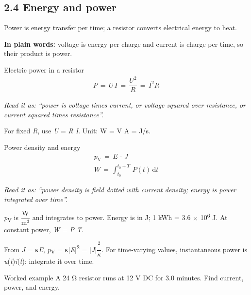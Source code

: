 \documentclass[11pt]{article}
\begin{document}
\begin{keepsection}
\section{2.4 Energy and power}

Power is energy transfer per time; a resistor converts electrical energy to heat.

\begin{plainbox}\textbf{In plain words:} voltage is energy per charge and current is charge per time, so their product is power.\end{plainbox}

\begin{equationcard}{Electric power in a resistor}
\[ \begin{gathered} {P}\, =\, {U\,I}\, =\, \dfrac{{U}^{2}}{{R}}\, =\, {I}^{2}{R} \end{gathered} \]
{\small \emph{Read it as: “power is voltage times current, or voltage squared over resistance, or current squared times resistance”.}\par For fixed \textit{R}, use \textit{U} = \textit{R I}. Unit: W = V A = J/s.}
\end{equationcard}

\begin{equationcard}{Power density and energy}
\[ \begin{gathered} {p}_{\mathrm{V}}\, =\, {E}\, \cdot \, {J} \\ {W}\, =\, \int_{{t}_{0}}^{{t}_{0}+{T}} \, {P}({t})\, \mathrm{d}{t} \end{gathered} \]
{\small \emph{Read it as: “power density is field dotted with current density; energy is power integrated over time”.}\par \textit{p}\textsubscript{V} is {\small\ensuremath{\dfrac{\mathrm{W}}{\mathrm{m}^{3}}}} and integrates to power. Energy is in J; 1 kWh = 3.6 \ensuremath{\times} 10\textsuperscript{6} J. At constant power, \textit{W} = \textit{P T}.}
\end{equationcard}

From \textit{J} = κ\textit{E}, \textit{p}\textsubscript{V} = κ|\textit{E}|\textsuperscript{2} = |\textit{J}|{\small\ensuremath{\dfrac{^{2}}{κ}}}. For time-varying values, instantaneous power is \textit{u}(\textit{t})\textit{i}(\textit{t}); integrate it over time.

\begin{workedbox}{Worked example}
A 24 Ω resistor runs at 12 V DC for 3.0 minutes. Find current, power, and energy.


\end{workedbox}
\end{keepsection}
\end{document}

